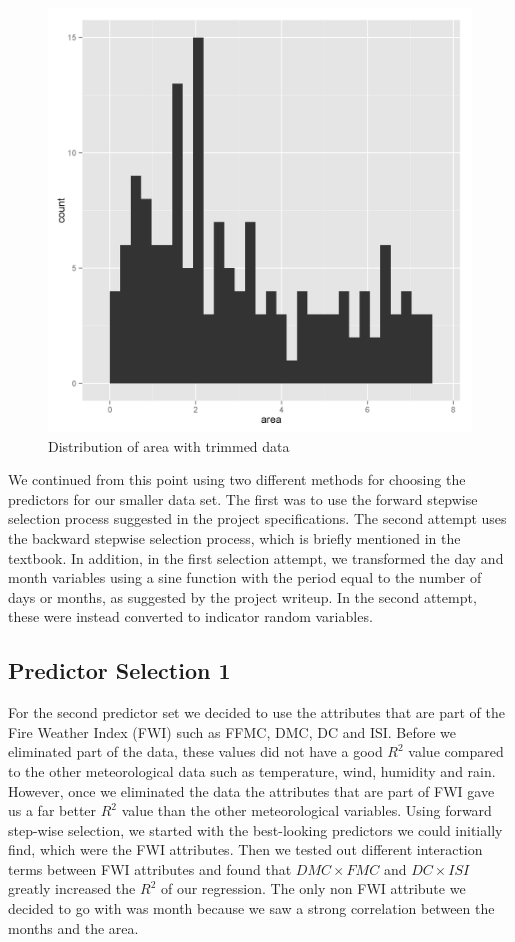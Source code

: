 \documentclass{article}
\begin{document}
\begin{figure}
\begin{minipage}[b]{0.45\linewidth}
  \includegraphics[width=\textwidth]{figures/goodhist.png}
  \caption{Distribution of area with trimmed data}
\end{minipage}
\end{figure}

We continued from this point using two different methods for choosing the
predictors for our smaller data set. The first was to use the forward stepwise
selection process suggested in the project specifications. The second attempt
uses the backward stepwise selection process, which is briefly mentioned in the
textbook. In addition, in the first selection attempt, we transformed the day
and month variables using a sine function with the period equal to the number
of days or months, as suggested by the project writeup. In the second attempt,
these were instead converted to indicator random variables.

\subsection{Predictor Selection 1}

For the second predictor set we decided to use the attributes that are part of
the Fire Weather Index (FWI) such as FFMC, DMC, DC and ISI.  Before we
eliminated part of the data, these values did not have a good $R^{2}$ value
compared to the other meteorological data such as temperature, wind, humidity
and rain. However, once we eliminated the data the attributes that are part of
FWI gave us a far better $R^{2}$ value than the other meteorological variables.
Using forward step-wise selection, we started with the best-looking predictors
we could initially find, which were the FWI attributes. Then we tested out
different interaction terms between FWI attributes and found that $DMC \times
FMC$  and $DC \times ISI$ greatly increased the $R^{2}$ of our regression. The
only non FWI attribute we decided to go with was month because we saw a strong
correlation between the months and the area.
\end{document}
